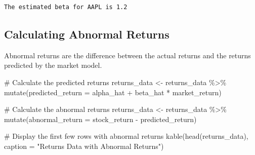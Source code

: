\documentclass[
]{scrartcl}
\newenvironment{Shaded}{\begin{snugshade}}{\end{snugshade}}
\newcommand{\AttributeTok}[1]{\textcolor[rgb]{0.40,0.45,0.13}{#1}}
\newcommand{\CommentTok}[1]{\textcolor[rgb]{0.37,0.37,0.37}{#1}}
\newcommand{\FunctionTok}[1]{\textcolor[rgb]{0.28,0.35,0.67}{#1}}
\newcommand{\NormalTok}[1]{\textcolor[rgb]{0.00,0.23,0.31}{#1}}
\newcommand{\OtherTok}[1]{\textcolor[rgb]{0.00,0.23,0.31}{#1}}
\newcommand{\SpecialCharTok}[1]{\textcolor[rgb]{0.37,0.37,0.37}{#1}}
\newcommand{\StringTok}[1]{\textcolor[rgb]{0.13,0.47,0.30}{#1}}
\begin{document}
\begin{verbatim}
The estimated beta for AAPL is 1.2
\end{verbatim}

\subsection{Calculating Abnormal
Returns}\label{calculating-abnormal-returns}

Abnormal returns are the difference between the actual returns and the
returns predicted by the market model.

\begin{Shaded}
\begin{Highlighting}[]
\CommentTok{\# Calculate the predicted returns}
\NormalTok{returns\_data }\OtherTok{\textless{}{-}}\NormalTok{ returns\_data }\SpecialCharTok{\%\textgreater{}\%}
  \FunctionTok{mutate}\NormalTok{(}\AttributeTok{predicted\_return =}\NormalTok{ alpha\_hat }\SpecialCharTok{+}\NormalTok{ beta\_hat }\SpecialCharTok{*}\NormalTok{ market\_return)}

\CommentTok{\# Calculate the abnormal returns}
\NormalTok{returns\_data }\OtherTok{\textless{}{-}}\NormalTok{ returns\_data }\SpecialCharTok{\%\textgreater{}\%}
  \FunctionTok{mutate}\NormalTok{(}\AttributeTok{abnormal\_return =}\NormalTok{ stock\_return }\SpecialCharTok{{-}}\NormalTok{ predicted\_return)}

\CommentTok{\# Display the first few rows with abnormal returns}
\FunctionTok{kable}\NormalTok{(}\FunctionTok{head}\NormalTok{(returns\_data), }\AttributeTok{caption =} \StringTok{"Returns Data with Abnormal Returns"}\NormalTok{)}
\end{Highlighting}
\end{Shaded}
\end{document}
